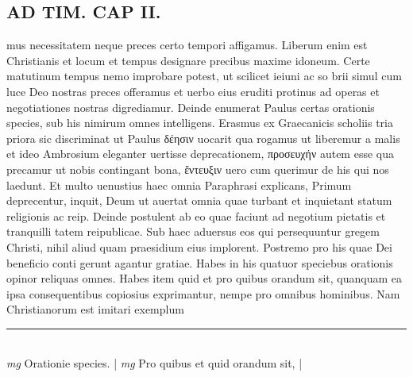 \documentclass{article}
\begin{document}
\begin{pages}
\section*{AD TIM. CAP II. }
\marginpar{[ p.111 ]}\pstart mus necessitatem neque preces certo tempori affigamus. Liberum enim est Christianis et locum et tempus designare precibus maxime idoneum. Certe matutinum tempus nemo improbare potest, ut scilicet ieiuni ac so brii simul cum luce Deo nostras preces offeramus et uerbo eius eruditi protinus ad operas et negotiationes nostras digrediamur. Deinde enumerat Paulus certas orationis species, sub his nimirum omnes intelligens. Erasmus ex Graecanicis scholiis tria priora sic discriminat ut Paulus δέησιν uocarit qua rogamus ut liberemur a malis et ideo Ambrosium eleganter uertisse deprecationem, προσευχήν autem esse qua precamur ut nobis contingant bona, ἔντευξιν uero cum querimur de his qui nos laedunt. Et multo uenustius haec omnia Paraphrasi explicans, Primum deprecentur, inquit, Deum ut auertat omnia quae turbant et inquietant statum religionis ac reip. Deinde postulent ab eo quae faciunt ad negotium pietatis et tranquilli tatem reipublicae. Sub haec aduersus eos qui persequuntur gregem Christi, nihil aliud quam praesidium eius implorent. Postremo pro his quae Dei beneficio conti gerunt agantur gratiae. Habes in his quatuor speciebus orationis opinor reliquas omnes. Habes item quid et pro quibus orandum sit, quanquam ea ipsa consequentibus copiosius exprimantur, nempe pro omnibus hominibus. Nam Christianorum est imitari exemplum  \pend
\vspace{0.5cm}\noindent
\vspace{0.2cm}\rule{1cm}{0.2pt}\\ 
\hspace{0.2cm}\textit{mg}
\footnotesize Orationie species. 
\normalsize| 
\hspace{0.2cm}\textit{mg}
\footnotesize Pro quibus et quid orandum sit, 
\normalsize| 

\end{pages}
\end{document}
